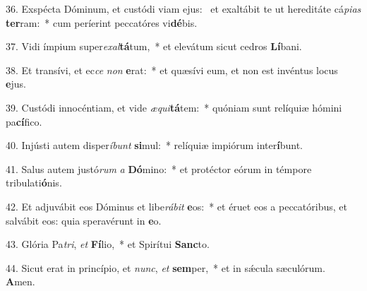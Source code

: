 36. Exspécta Dóminum, et custódi viam ejus: \dag\  et exaltábit te ut hereditáte cá\textit{pi}\textit{as} \textbf{ter}ram:~*  cum períerint peccatóres vi\textbf{dé}bis.\

37. Vidi ímpium super\textit{ex}\textit{al}\textbf{tá}tum,~*  et elevátum sicut cedros \textbf{Lí}bani.\

38. Et transívi, et ec\textit{ce} \textit{non} \textbf{e}rat:~*  et quæsívi eum, et non est invéntus locus \textbf{e}jus.\

39. Custódi innocéntiam, et vide \textit{æ}\textit{qui}\textbf{tá}tem:~*  quóniam sunt relíquiæ hómini pa\textbf{cí}fico.\

40. Injústi autem disper\textit{í}\textit{bunt} \textbf{si}mul:~*  relíquiæ impiórum inter\textbf{í}bunt.\

41. Salus autem justó\textit{rum} \textit{a} \textbf{Dó}mino:~*  et protéctor eórum in témpore tribulati\textbf{ó}nis.\

42. Et adjuvábit eos Dóminus et libe\textit{rá}\textit{bit} \textbf{e}os:~*  et éruet eos a peccatóribus, et salvábit eos: quia speravérunt in \textbf{e}o.\

43. Glória Pa\textit{tri}, \textit{et} \textbf{Fí}lio,~*  et Spirítui \textbf{Sanc}to.\

44. Sicut erat in princípio, et \textit{nunc}, \textit{et} \textbf{sem}per,~*  et in sǽcula sæculórum. \textbf{A}men.\

